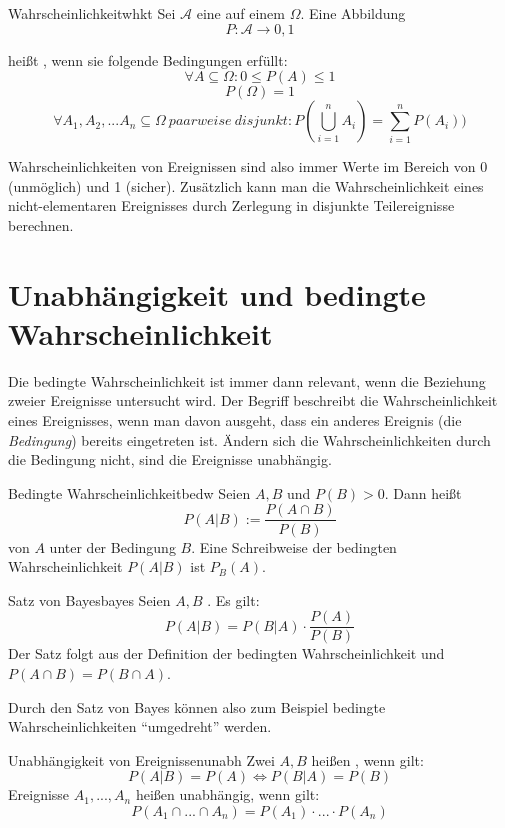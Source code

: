 \begin{definition}{Wahrscheinlichkeit}{whkt}
Sei $\mathcal{A}$ eine  auf einem
 $\Omega$. Eine Abbildung
\[ P: \mathcal{A} \to 0,1 \]

heißt , wenn sie folgende Bedingungen erfüllt:
\[\forall A \subseteq \Omega: 0 \leq P(A) \leq 1\]
\[P(\Omega) = 1\]
\[\forall A_1, A_2, ... A_n \subseteq \Omega\ paarweise\ disjunkt:
P(\bigcup_{i=1}^{n} A_i) = \sum_{i=1}^{n}P(A_i))\]
\end{definition}

Wahrscheinlichkeiten von Ereignissen sind also immer Werte im Bereich von 0
(unmöglich) und 1 (sicher). Zusätzlich kann man die Wahrscheinlichkeit eines
nicht-elementaren Ereignisses durch Zerlegung in disjunkte Teilereignisse
berechnen.


\section{Unabhängigkeit und bedingte Wahrscheinlichkeit}

Die bedingte Wahrscheinlichkeit ist immer dann relevant, wenn die Beziehung
zweier Ereignisse untersucht wird. Der Begriff beschreibt die Wahrscheinlichkeit
eines Ereignisses, wenn man davon ausgeht, dass ein anderes Ereignis (die
\emph{Bedingung}) bereits eingetreten ist. Ändern sich die Wahrscheinlichkeiten
durch die Bedingung nicht, sind die Ereignisse unabhängig.

\begin{definition}{Bedingte Wahrscheinlichkeit}{bedw}
Seien $A, B$  und $P(B)>0$. Dann heißt
\[P(A|B) := \frac{P(A\cap B)}{P(B)}\]
 von $A$ unter der Bedingung $B$.
Eine Schreibweise der bedingten Wahrscheinlichkeit $P(A|B)$ ist $P_B(A)$.
\end{definition}

\begin{theorem}{Satz von Bayes}{bayes}
Seien $A,B$ . Es gilt:
\[P(A|B) = P(B|A) \cdot\frac{P(A)}{P(B)}\]
Der Satz folgt aus der Definition der bedingten Wahrscheinlichkeit und $P(A\cap
B) = P(B\cap A)$.
\end{theorem}
Durch den Satz von Bayes können also zum Beispiel bedingte Wahrscheinlichkeiten
"`umgedreht"' werden.

\begin{definition}{Unabhängigkeit von Ereignissen}{unabh}
Zwei  $A, B$ heißen , wenn gilt:
\[P(A|B) = P(A) \iff P(B|A) = P(B)\]
Ereignisse $A_1,...,A_n$ heißen unabhängig, wenn gilt:
\[P(A_1\cap ...\cap A_n) = P(A_1)\cdot ...\cdot P(A_n)\]
\end{definition}


